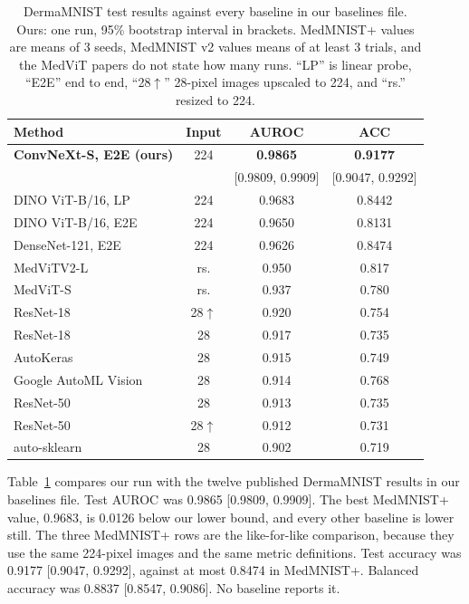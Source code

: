 \documentclass[conference]{IEEEtran}
\begin{document}
\begin{table}[t]
\caption{DermaMNIST test results against every baseline in our baselines file. Ours: one run, 95\% bootstrap interval in brackets. MedMNIST+ values are means of 3 seeds, MedMNIST v2 values means of at least 3 trials, and the MedViT papers do not state how many runs. ``LP'' is linear probe, ``E2E'' end to end, ``28$\uparrow$'' 28-pixel images upscaled to 224, and ``rs.'' resized to 224.}
\label{tab:main}
\centering
\footnotesize
\setlength{\tabcolsep}{2.5pt}
\begin{tabular}{@{}lccc@{}}
\toprule
Method & Input & AUROC & ACC \\
\midrule
\textbf{ConvNeXt-S, E2E (ours)} & 224 & \textbf{0.9865} & \textbf{0.9177} \\
 & & {\scriptsize [0.9809, 0.9909]} & {\scriptsize [0.9047, 0.9292]} \\
\midrule
DINO ViT-B/16, LP~\cite{doerrich2025medmnistplus} & 224 & 0.9683 & 0.8442 \\
DINO ViT-B/16, E2E~\cite{doerrich2025medmnistplus} & 224 & 0.9650 & 0.8131 \\
DenseNet-121, E2E~\cite{doerrich2025medmnistplus} & 224 & 0.9626 & 0.8474 \\
MedViTV2-L~\cite{manzari2026medvitv2} & rs. & 0.950 & 0.817 \\
MedViT-S~\cite{manzari2023medvit} & rs. & 0.937 & 0.780 \\
ResNet-18~\cite{yang2023medmnistv2} & 28$\uparrow$ & 0.920 & 0.754 \\
ResNet-18~\cite{yang2023medmnistv2} & 28 & 0.917 & 0.735 \\
AutoKeras~\cite{yang2023medmnistv2} & 28 & 0.915 & 0.749 \\
Google AutoML Vision~\cite{yang2023medmnistv2} & 28 & 0.914 & 0.768 \\
ResNet-50~\cite{yang2023medmnistv2} & 28 & 0.913 & 0.735 \\
ResNet-50~\cite{yang2023medmnistv2} & 28$\uparrow$ & 0.912 & 0.731 \\
auto-sklearn~\cite{yang2023medmnistv2} & 28 & 0.902 & 0.719 \\
\bottomrule
\end{tabular}
\end{table}

Table~\ref{tab:main} compares our run with the twelve published DermaMNIST results in our baselines file. Test AUROC was 0.9865 [0.9809, 0.9909]. The best MedMNIST+ value, 0.9683, is 0.0126 below our lower bound, and every other baseline is lower still. The three MedMNIST+ rows are the like-for-like comparison, because they use the same 224-pixel images and the same metric definitions. Test accuracy was 0.9177 [0.9047, 0.9292], against at most 0.8474 in MedMNIST+. Balanced accuracy was 0.8837 [0.8547, 0.9086]. No baseline reports it.
\end{document}
